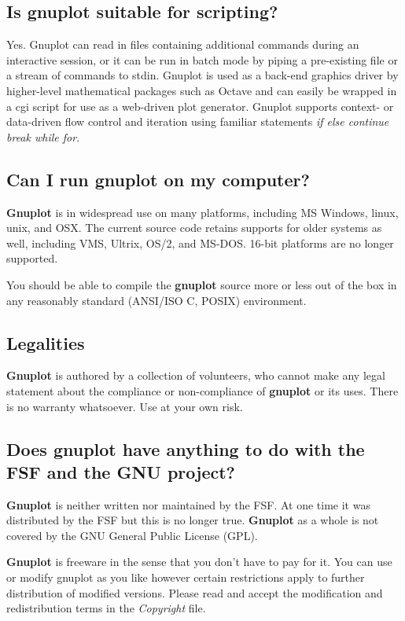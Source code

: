 \documentclass[a4paper,11pt]{article}
\newcommand{\gnuplot}{\textbf{gnuplot }}
\newcommand{\Gnuplot}{\textbf{Gnuplot }}
\begin{document}
\subsection{Is \gnuplot suitable for scripting?}

Yes. Gnuplot can read in files containing additional commands during
an interactive session, or it can be run in batch mode by piping a
pre-existing file or a stream of commands to stdin. Gnuplot is used
as a back-end graphics driver by higher-level mathematical packages
such as Octave and can easily be wrapped in a cgi script for use as a
web-driven plot generator.  Gnuplot supports context- or data-driven
flow control and iteration using familiar statements
{\em if else continue break while for}.


\subsection{Can I run \gnuplot on my computer?}

\Gnuplot{} is in widespread use on many platforms, including
MS Windows, linux, unix, and OSX.  The current source code retains
supports for older systems as well, including VMS, Ultrix, OS/2, and
MS-DOS. 16-bit platforms are no longer supported.

You should be able to compile the \gnuplot source more or
less out of the box in any reasonably standard (ANSI/ISO C, POSIX)
environment.


\subsection{Legalities}

\Gnuplot{} is authored by a collection of volunteers, who cannot
make any legal statement about the compliance or non-compliance of
\gnuplot or its uses. There is no warranty whatsoever. Use at your own risk.


\subsection{Does \gnuplot have anything to do with the FSF and the GNU
project?}

\Gnuplot{} is neither written nor maintained by the FSF\@. At one time it
was distributed by the FSF but this is no longer true. \Gnuplot{} as a whole
is not covered by the GNU General Public License (GPL).

\Gnuplot{} is freeware in the sense that you don't have to pay for it.
You can use or modify gnuplot as you like however certain restrictions
apply to further distribution of modified versions.
Please read and accept the modification and redistribution terms in
the \textit{Copyright} file.
\end{document}
